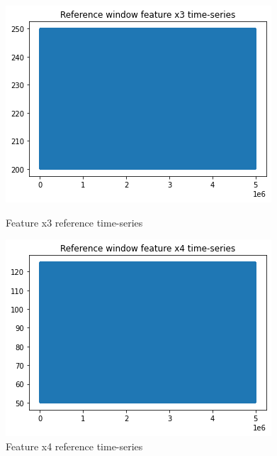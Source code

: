\begin{figure}[!htb]
  \begin{minipage}[b]{0.5\linewidth}
    \centering
    \includegraphics[width=1\linewidth]{figures/timeseries-r6-x3.png} 
    \caption{Feature x3 reference time-series} 
    \label{fig:timeseries-r6-x3} 
    \vspace{4ex}
  \end{minipage}%
  \begin{minipage}[b]{0.5\linewidth}
    \centering
    \includegraphics[width=1\linewidth]{figures/timeseries-r6-x4.png} 
    \caption{Feature x4 reference time-series} 
    \label{fig:timeseries-r6-x4} 
    \vspace{4ex}
  \end{minipage} 
\end{figure}

